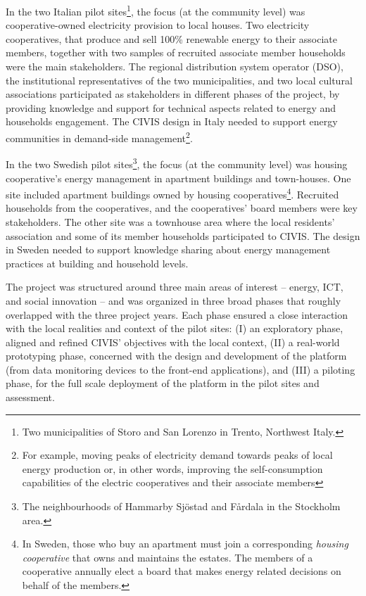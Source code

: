 In the two Italian pilot sites\footnote{Two municipalities of Storo and San Lorenzo in Trento, Northwest Italy.}, the focus (at the community level) was cooperative-owned electricity provision to local houses. 
Two electricity cooperatives, that produce and 
sell 100\% renewable energy to their associate members, together with two samples of recruited 
associate member households were the main stakeholders.
The regional distribution system 
operator (DSO), the institutional representatives of the two municipalities, and two local cultural 
associations participated as stakeholders in different phases of the project, by providing knowledge 
and support for technical aspects related to energy and households engagement.
The CIVIS design in Italy needed to support energy communities in demand-side management\footnote{For example, moving peaks of electricity demand towards peaks of local energy
production or, in other words, improving the self-consumption capabilities of the electric cooperatives and
their associate members}. 
% 

In the two Swedish pilot sites\footnote{The neighbourhoods of Hammarby Sj\"{o}stad and F\aa{}rdala in the Stockholm area.}, the focus (at the community level) was housing cooperative's energy management in apartment buildings and town-houses.  
One site included apartment buildings owned by housing 
cooperatives\footnote{In Sweden, those who buy an apartment must join a corresponding \textit{housing cooperative} that owns and maintains the estates. The 
members of a cooperative annually elect a board that makes energy related decisions on behalf of 
the members.}. Recruited households from the cooperatives, and the cooperatives' board members were key stakeholders. %
The other site was a townhouse area where the 
local residents' association and some of its member households participated to CIVIS.
The design in Sweden needed to support knowledge sharing about energy management practices at building and household levels.

The project was 
structured around three main areas of interest -- energy, ICT, and social innovation 
-- and was organized in three broad phases that roughly overlapped with the three project years.
Each phase ensured a close interaction with the local realities and context of the pilot sites: (I) an 
exploratory phase, aligned and refined CIVIS' objectives with the local context,
(II) a real-world prototyping phase, concerned with the design and development of the platform 
(from data monitoring devices to the front-end applications), and (III) a piloting 
phase, for the full scale deployment of the platform in the pilot sites and 
assessment.

